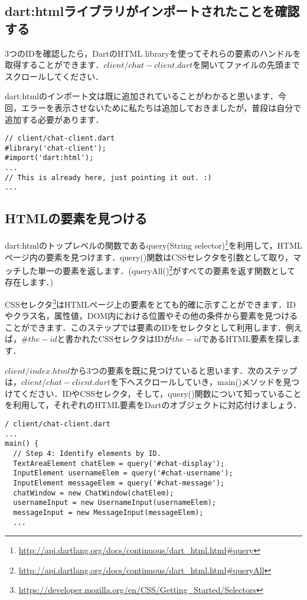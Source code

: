 \subsection{dart:htmlライブラリがインポートされたことを確認する}

3つのIDを確認したら，DartのHTML libraryを使ってそれらの要素のハンドルを取得することができます．$ client/chat-client.dart $を開いてファイルの先頭までスクロールしてください．

dart:htmlのインポート文は既に追加されていることがわかると思います．今回，エラーを表示させないために私たちは追加しておきましたが，普段は自分で追加する必要があります．

\begin{verbatim}
// client/chat-client.dart
#library('chat-client');
#import('dart:html');
...
// This is already here, just pointing it out. :)
...
\end{verbatim}

\subsection{HTMLの要素を見つける}

dart:htmlのトップレベルの関数であるquery(String selector)\footnote{\url{http://api.dartlang.org/docs/continuous/dart\_html.html\#query}}を利用して，HTMLページ内の要素を見つけます．query()関数はCSSセレクタを引数として取り，マッチした単一の要素を返します．(queryAll()\footnote{\url{http://api.dartlang.org/docs/continuous/dart\_html.html\#queryAll}}がすべての要素を返す関数として存在します．)

CSSセレクタ\footnote{\url{https://developer.mozilla.org/en/CSS/Getting\_Started/Selectors}}はHTMLページ上の要素をとても的確に示すことができます．IDやクラス名，属性値，DOM内における位置やその他の条件から要素を見つけることができます．このステップでは要素のIDをセレクタとして利用します．例えば，$ \#the-id $と書かれたCSSセレクタはIDが$ the-id $であるHTML要素を探します．

$ client/index.html $から3つの要素を既に見つけていると思います．次のステップは，$ client/chat-client.dart $を下へスクロールしていき，main()メソッドを見つけてください．IDやCSSセレクタ，そして，query()関数について知っていることを利用して，それぞれのHTML要素をDartのオブジェクトに対応付けましょう．

\begin{verbatim}
/ client/chat-client.dart
...
main() {
  // Step 4: Identify elements by ID.
  TextAreaElement chatElem = query('#chat-display');
  InputElement usernameElem = query('#chat-username');
  InputElement messageElem = query('#chat-message');
  chatWindow = new ChatWindow(chatElem);
  usernameInput = new UsernameInput(usernameElem);
  messageInput = new MessageInput(messageElem);
  ...
\end{verbatim}

